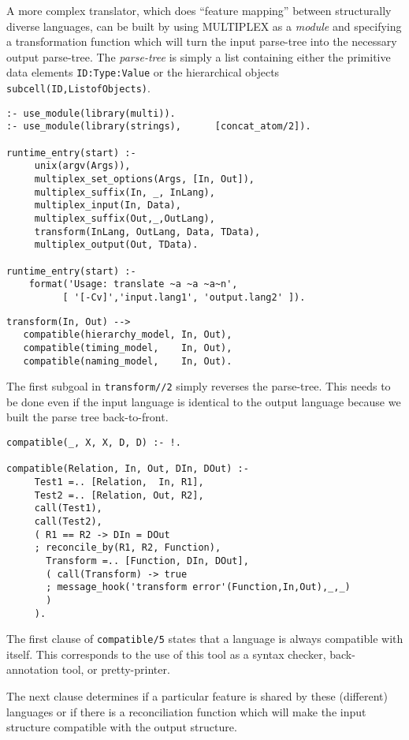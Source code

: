 A more complex translator, which does ``feature mapping''
between structurally diverse languages,
can be built by using MULTIPLEX as a {\it module}
and specifying a transformation function which will turn
the input parse-tree into the necessary output parse-tree.
The {\it parse-tree} is simply a list containing either
the primitive data elements {\tt ID:Type:Value} or the
hierarchical objects {\tt subcell(ID,ListofObjects)}.

\begin{verbatim}
:- use_module(library(multi)).
:- use_module(library(strings),      [concat_atom/2]).

runtime_entry(start) :-
     unix(argv(Args)),
     multiplex_set_options(Args, [In, Out]),
     multiplex_suffix(In, _, InLang),
     multiplex_input(In, Data),
     multiplex_suffix(Out,_,OutLang),
     transform(InLang, OutLang, Data, TData),
     multiplex_output(Out, TData).

runtime_entry(start) :-
    format('Usage: translate ~a ~a ~a~n',
          [ '[-Cv]','input.lang1', 'output.lang2' ]).
\end{verbatim}

\begin{verbatim}
transform(In, Out) -->
   compatible(hierarchy_model, In, Out),
   compatible(timing_model,    In, Out),
   compatible(naming_model,    In, Out).
\end{verbatim}

The first subgoal in {\tt transform//2} simply
reverses the parse-tree. This needs to be done even
if the input language is identical to the output
language because we built the parse tree back-to-front.

\begin{verbatim}
compatible(_, X, X, D, D) :- !.

compatible(Relation, In, Out, DIn, DOut) :-
     Test1 =.. [Relation,  In, R1],
     Test2 =.. [Relation, Out, R2],
     call(Test1),
     call(Test2),
     ( R1 == R2 -> DIn = DOut
     ; reconcile_by(R1, R2, Function),
       Transform =.. [Function, DIn, DOut],
       ( call(Transform) -> true
       ; message_hook('transform error'(Function,In,Out),_,_)
       )
     ).
\end{verbatim}

The first clause of {\tt compatible/5} states that a language
is always compatible with itself.  This corresponds to 
the use of this tool as a syntax checker, back-annotation tool,
or pretty-printer.

The next clause determines if a particular feature
is shared by these (different) languages or
if there is a reconciliation function which will make
the input structure compatible with the output structure.

